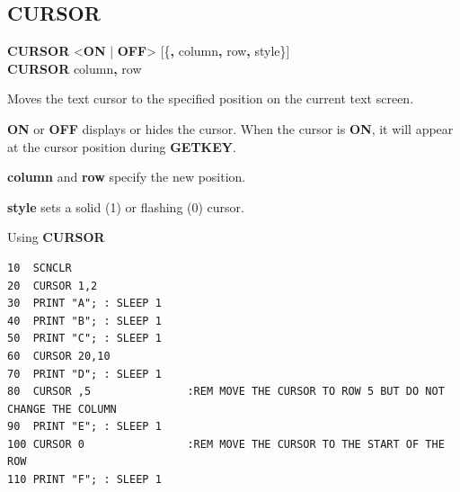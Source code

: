 \subsection{CURSOR}
\begin{description}[leftmargin=2cm,style=nextline]
\item [Format:] {\bf CURSOR} <{\bf ON} | {\bf OFF}> [\{{\bf,} column{\bf,} row{\bf,} style\}] \\
                {\bf CURSOR} column{\bf,} row{\bf}
\item [Usage:] Moves the text cursor to
               the specified position on the current text screen.

               {\bf ON} or {\bf OFF} displays or hides the cursor. When the cursor is {\bf ON},
               it will appear at the cursor position during {\bf GETKEY}.

               {\bf column} and {\bf row} specify the new position.

               {\bf style} sets a solid (1) or flashing (0) cursor.
\item [Example:] Using {\bf CURSOR}
\begin{tcolorbox}[colback=black,coltext=white]
\verbatimfont{\codefont}
\begin{verbatim}
10  SCNCLR
20  CURSOR 1,2
30  PRINT "A"; : SLEEP 1
40  PRINT "B"; : SLEEP 1
50  PRINT "C"; : SLEEP 1
60  CURSOR 20,10
70  PRINT "D"; : SLEEP 1
80  CURSOR ,5               :REM MOVE THE CURSOR TO ROW 5 BUT DO NOT CHANGE THE COLUMN
90  PRINT "E"; : SLEEP 1
100 CURSOR 0                :REM MOVE THE CURSOR TO THE START OF THE ROW
110 PRINT "F"; : SLEEP 1
\end{verbatim}
\end{tcolorbox}
\end{description}


\newpage
